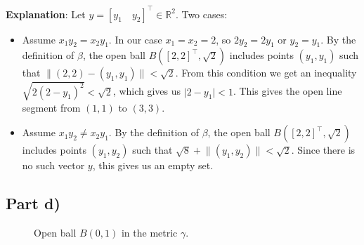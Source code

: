 \documentclass[11pt,a4paper]{article}
\theoremstyle{plain}
\theoremstyle{definition}
\theoremstyle{remark}
\begin{document}
\noindent
\textbf{Explanation}: Let $y = [y_1 \quad y_2]^\top \in \mathbb{R}^2$. Two cases: 
\begin{itemize}
    \item Assume $x_1y_2 = x_2y_1$. In our case $x_1 = x_2 = 2$, so $2y_2 = 2y_1$ or $y_2 = y_1$. By the definition of
    $\beta$, the open ball $B([2, 2]^\top, \sqrt{2})$ includes points $(y_1, y_1)$ such that $\lVert (2,2) - (y_1, y_1)\rVert < \sqrt{2}$.
    From this condition we get an inequality $\sqrt{2(2-y_1)^2} < \sqrt{2}$, which gives us $\lvert 2 - y_1 \rvert < 1$.
    This gives the open line segment from $(1,1)$ to $(3,3)$.
    \item Assume $x_1y_2 \neq x_2y_1$. By the definition of $\beta$, the open ball $B([2, 2]^\top, \sqrt{2})$ includes points $(y_1, y_2)$ 
    such that $\sqrt{8} + \lVert (y_1, y_2) \rVert < \sqrt{2}$. Since there is no such vector $y$, this gives us an empty set.
\end{itemize}

\subsection{Part d)}

\begin{figure}[H]
\centering
{}
\caption{Open ball $B(0,1)$ in the metric $\gamma$.}
\end{figure}

\vspace*{30px}
\end{document}
